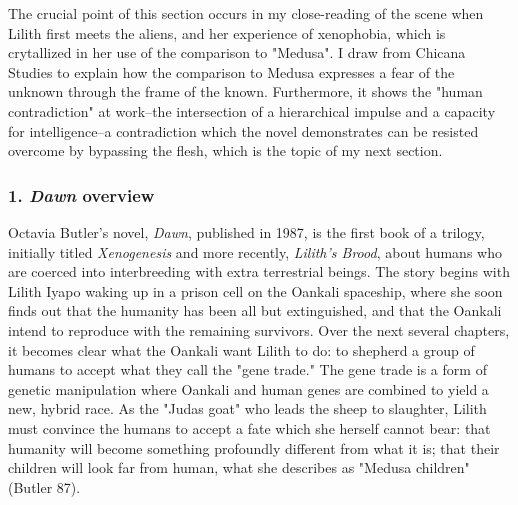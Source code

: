 \documentclass[11pt]{article}
\begin{document}
The crucial point of this section occurs in my close-reading of the
scene when Lilith first meets the aliens, and her experience of
xenophobia, which is crytallized in her use of the comparison to
"Medusa". I draw from Chicana Studies to explain how the comparison to
Medusa expresses a fear of the unknown through the frame of the
known. Furthermore, it shows the "human contradiction" at work--the
intersection of a hierarchical impulse and a capacity for
intelligence--a contradiction which the novel demonstrates can be
resisted overcome by bypassing the flesh, which is the topic of my
next section.

\subsubsection{1. \emph{Dawn} overview}
\label{sec:orgacd99c6}
Octavia Butler's novel, \emph{Dawn}, published in 1987, is the first book
of a trilogy, initially titled \emph{Xenogenesis} and more recently,
\emph{Lilith's Brood}, about humans who are coerced into interbreeding with
extra terrestrial beings. The story begins with Lilith Iyapo waking up
in a prison cell on the Oankali spaceship, where she soon finds out
that the humanity has been all but extinguished, and that the Oankali
intend to reproduce with the remaining survivors. Over the next
several chapters, it becomes clear what the Oankali want Lilith to do:
to shepherd a group of humans to accept what they call the "gene
trade." The gene trade is a form of genetic manipulation where Oankali
and human genes are combined to yield a new, hybrid race. As the
"Judas goat" who leads the sheep to slaughter, Lilith must convince
the humans to accept a fate which she herself cannot bear: that
humanity will become something profoundly different from what it is;
that their children will look far from human, what she describes as
"Medusa children" (Butler 87).
\end{document}
